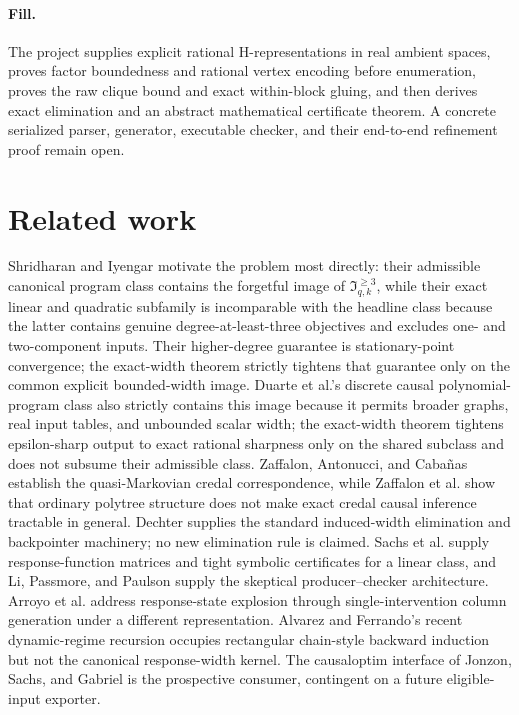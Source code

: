\documentclass{article}
\begin{document}
\paragraph{Fill.} The project supplies explicit rational H-representations in real ambient spaces, proves factor boundedness and rational vertex encoding before enumeration, proves the raw clique bound and exact within-block gluing, and then derives exact elimination and an abstract mathematical certificate theorem. A concrete serialized parser, generator, executable checker, and their end-to-end refinement proof remain open.

\section{Related work}

Shridharan and Iyengar motivate the problem most directly: their admissible canonical program class contains the forgetful image of \(\mathfrak I_{q,k}^{\ge3}\), while their exact linear and quadratic subfamily is incomparable with the headline class because the latter contains genuine degree-at-least-three objectives and excludes one- and two-component inputs. Their higher-degree guarantee is stationary-point convergence; the exact-width theorem strictly tightens that guarantee only on the common explicit bounded-width image. Duarte et al.'s discrete causal polynomial-program class also strictly contains this image because it permits broader graphs, real input tables, and unbounded scalar width; the exact-width theorem tightens epsilon-sharp output to exact rational sharpness only on the shared subclass and does not subsume their admissible class. Zaffalon, Antonucci, and Cabañas establish the quasi-Markovian credal correspondence, while Zaffalon et al. show that ordinary polytree structure does not make exact credal causal inference tractable in general. Dechter supplies the standard induced-width elimination and backpointer machinery; no new elimination rule is claimed. Sachs et al. supply response-function matrices and tight symbolic certificates for a linear class, and Li, Passmore, and Paulson supply the skeptical producer--checker architecture. Arroyo et al. address response-state explosion through single-intervention column generation under a different representation. Alvarez and Ferrando's recent dynamic-regime recursion occupies rectangular chain-style backward induction but not the canonical response-width kernel. The causaloptim interface of Jonzon, Sachs, and Gabriel is the prospective consumer, contingent on a future eligible-input exporter.
\end{document}
